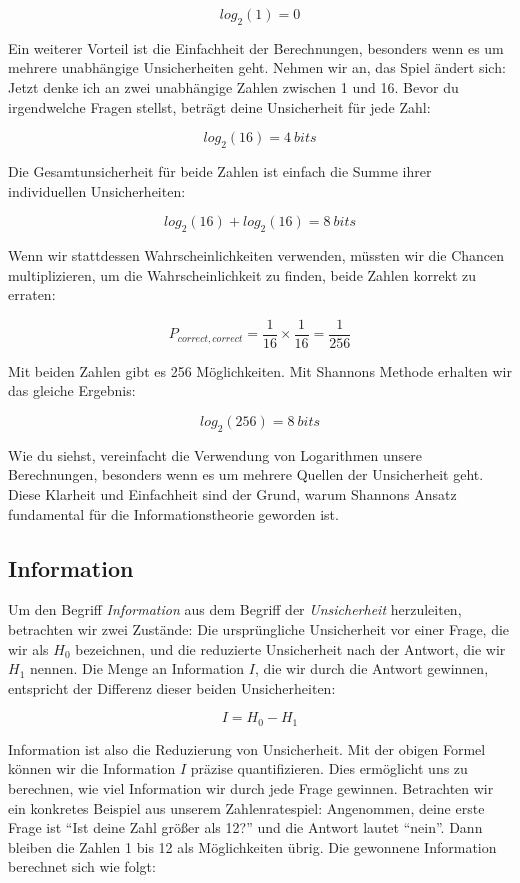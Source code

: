 \documentclass[
  letterpaper,
  DIV=11]{scrreprt}
\begin{document}
\[
log_2(1) = 0
\]

Ein weiterer Vorteil ist die Einfachheit der Berechnungen, besonders
wenn es um mehrere unabhängige Unsicherheiten geht. Nehmen wir an, das
Spiel ändert sich: Jetzt denke ich an zwei unabhängige Zahlen zwischen 1
und 16. Bevor du irgendwelche Fragen stellst, beträgt deine Unsicherheit
für jede Zahl:

\[
log_2(16)= 4~bits
\]

Die Gesamtunsicherheit für beide Zahlen ist einfach die Summe ihrer
individuellen Unsicherheiten:

\[
log_2(16)+log_2(16)=8~bits
\]

Wenn wir stattdessen Wahrscheinlichkeiten verwenden, müssten wir die
Chancen multiplizieren, um die Wahrscheinlichkeit zu finden, beide
Zahlen korrekt zu erraten:

\[
P_{correct,correct}=\frac{1}{16}\times\frac{1}{16}=\frac{1}{256}
\]

Mit beiden Zahlen gibt es 256 Möglichkeiten. Mit Shannons Methode
erhalten wir das gleiche Ergebnis:

\[
log_2(256)=8~bits
\]

Wie du siehst, vereinfacht die Verwendung von Logarithmen unsere
Berechnungen, besonders wenn es um mehrere Quellen der Unsicherheit
geht. Diese Klarheit und Einfachheit sind der Grund, warum Shannons
Ansatz fundamental für die Informationstheorie geworden ist.

\subsection{Information}\label{information}

Um den Begriff \emph{Information} aus dem Begriff der
\emph{Unsicherheit} herzuleiten, betrachten wir zwei Zustände: Die
ursprüngliche Unsicherheit vor einer Frage, die wir als \(H_0\)
bezeichnen, und die reduzierte Unsicherheit nach der Antwort, die wir
\(H_1\) nennen. Die Menge an Information \(I\), die wir durch die
Antwort gewinnen, entspricht der Differenz dieser beiden Unsicherheiten:

\[
I = H_0 - H_1
\]

Information ist also die Reduzierung von Unsicherheit. Mit der obigen
Formel können wir die Information \(I\) präzise quantifizieren. Dies
ermöglicht uns zu berechnen, wie viel Information wir durch jede Frage
gewinnen. Betrachten wir ein konkretes Beispiel aus unserem
Zahlenratespiel: Angenommen, deine erste Frage ist ``Ist deine Zahl
größer als 12?'' und die Antwort lautet ``nein''. Dann bleiben die
Zahlen 1 bis 12 als Möglichkeiten übrig. Die gewonnene Information
berechnet sich wie folgt:
\end{document}
